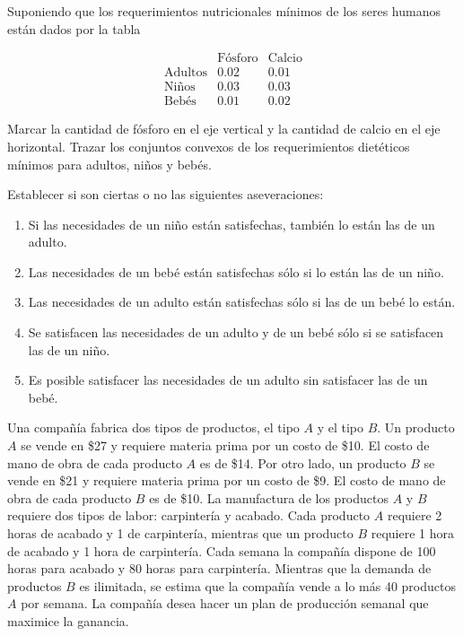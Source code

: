 \begin{Ejer} Suponiendo que los requerimientos nutricionales m\'inimos de los seres humanos est\'an dados por la tabla

\[
\begin{array}{c|cc}
 & \text{F\'osforo} & \text{Calcio} \\
\hline
\text{Adultos} & 0.02 & 0.01 \\
\text{Ni\~nos} & 0.03 & 0.03 \\
\text{Beb\'es} & 0.01 & 0.02
\end{array}
\]

Marcar la cantidad de f\'osforo en el eje vertical y la cantidad de calcio en el eje horizontal.  
Trazar los conjuntos convexos de los requerimientos diet\'eticos m\'inimos para adultos, ni\~nos y beb\'es.

Establecer si son ciertas o no las siguientes aseveraciones:

\begin{enumerate}
\item[a)] Si las necesidades de un ni\~no est\'an satisfechas, tambi\'en lo est\'an las de un adulto.
\item[b)] Las necesidades de un beb\'e est\'an satisfechas s\'olo si lo est\'an las de un ni\~no.
\item[c)] Las necesidades de un adulto est\'an satisfechas s\'olo si las de un beb\'e lo est\'an.
\item[d)] Se satisfacen las necesidades de un adulto y de un beb\'e s\'olo si se satisfacen las de un ni\~no.
\item[e)] Es posible satisfacer las necesidades de un adulto sin satisfacer las de un beb\'e.
\end{enumerate}
\end{Ejer}


\begin{Ejer}
Una compa\~n\'ia fabrica dos tipos de productos, el tipo $A$ y el tipo $B$. Un producto $A$ se vende en \$27 y requiere materia prima por un costo de \$10. El costo de mano de obra de cada producto $A$ es de \$14. Por otro lado, un producto $B$ se vende en \$21 y requiere materia prima por un costo de \$9. El costo de mano de obra de cada producto $B$ es de \$10. La manufactura de los productos $A$ y $B$ requiere dos tipos de labor: carpinter\'ia y acabado. Cada producto $A$ requiere 2 horas de acabado y 1 de carpinter\'ia, mientras que un producto $B$ requiere 1 hora de acabado y 1 hora de carpinter\'ia. Cada semana la compa\~n\'ia dispone de 100 horas para acabado y 80 horas para carpinter\'ia. Mientras que la demanda de productos $B$ es ilimitada, se estima que la compa\~n\'ia vende a lo m\'as 40 productos $A$ por semana. La compa\~n\'ia desea hacer un plan de producci\'on semanal que maximice la ganancia.
\end{Ejer}


